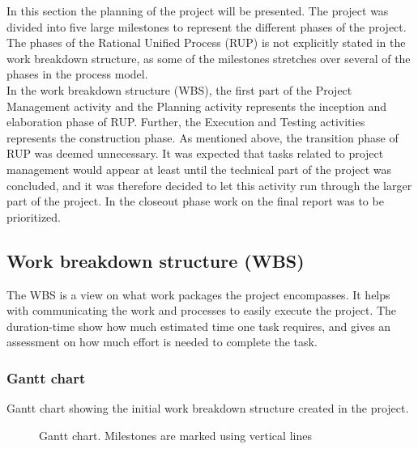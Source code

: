 In this section the planning of the project will be presented. The project was divided into five large milestones to represent the different phases of the project. The phases of the Rational Unified Process (RUP) is not explicitly stated in the work breakdown structure, as some of the milestones stretches over several of the phases in the process model. \\
\newline
In the work breakdown structure (WBS), the first part of the Project Management activity and the Planning activity represents the inception and elaboration phase of RUP. Further, the Execution and Testing activities represents the construction phase. As mentioned above, the transition phase of RUP was deemed unnecessary. It was expected that tasks related to project management would appear at least until the technical part of the project was concluded, and it was therefore decided to let this activity run through the larger part of the project. In the closeout phase work on the final report was to be prioritized.

\subsection{Work breakdown structure (WBS)}
The WBS is a view on what work packages the project encompasses. It helps with communicating the work and processes to easily execute the project. The duration-time show how much estimated time one task requires, and gives an assessment on how much effort is needed to complete the task.

\subsubsection{Gantt chart}
Gantt chart showing the initial work breakdown structure created in the project.
\begin{figure}[H]
\caption{Gantt chart. Milestones are marked using vertical lines}
\end{figure}

